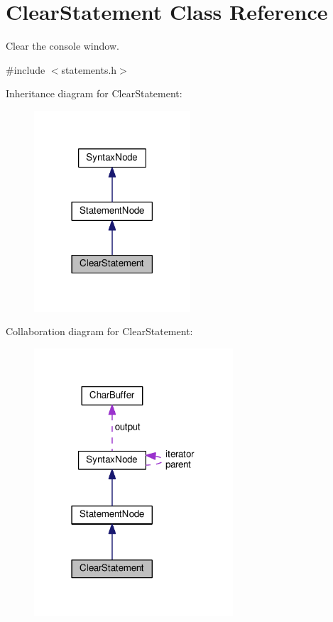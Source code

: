 \hypertarget{classClearStatement}{}\section{Clear\+Statement Class Reference}
\label{classClearStatement}


Clear the console window.  




{\ttfamily \#include $<$statements.\+h$>$}



Inheritance diagram for Clear\+Statement\+:\nopagebreak
\begin{figure}[H]
\begin{center}
\leavevmode
\includegraphics[width=165pt]{classClearStatement__inherit__graph}
\end{center}
\end{figure}


Collaboration diagram for Clear\+Statement\+:\nopagebreak
\begin{figure}[H]
\begin{center}
\leavevmode
\includegraphics[width=210pt]{classClearStatement__coll__graph}
\end{center}
\end{figure}
